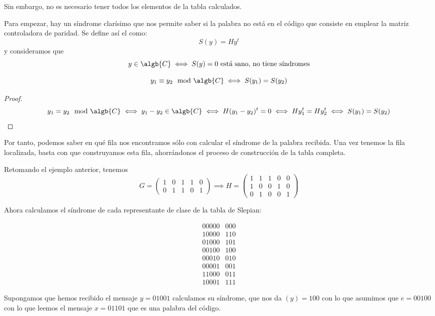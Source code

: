 Sin embargo, no es necesario tener todos los elementos de la tabla calculados.

Para empezar, hay un síndrome clarísimo que nos permite saber si la palabra no está en el código que consiste en emplear la matriz controladora de paridad. Se define así el  como:
\[S(y) = Hy^t\]
y consideramos que
\[y \in \algb{C} \iff S(y) = 0 \text{ está sano, no tiene síndromes}\]

\obs
\[y_1 \equiv y_2 \mod \algb{C} \iff S(y_1)=S(y_2)\]
\begin{proof}
\[y_1 = y_2 \mod \algb{C} \iff y_1-y_2 \in \algb{C} \iff H(y_1-y_2)^t = 0 \iff Hy_1^t = Hy_2^t \iff S(y_1)=S(y_2)\]
\end{proof}

Por tanto, podemos saber en qué fila nos encontramos sólo con calcular el síndrome de la palabra recibida. Una vez tenemos la fila localizada, basta con que construyamos esta fila, ahorrándonos el proceso de construcción de la tabla completa.

\begin{example}
Retomando el ejemplo anterior, tenemos
\[G = \left(\begin{array}{ccccc} 1 & 0 & 1 & 1 & 0 \\ 0 & 1 & 1 & 0 & 1 \end{array}\right)  \implies H = \left(\begin{array}{ccccc}
1 & 1 & 1 & 0 & 0 \\
1 & 0 & 0 & 1 & 0 \\
0 & 1 & 0 & 0 & 1
\end{array}\right) \]

Ahora calculamos el síndrome de cada representante de clase de la tabla de Slepian:

\[\begin{array}{cc}
00000 & 000\\
10000 & 110\\
01000 & 101\\
00100 & 100\\
00010 & 010\\
00001 & 001\\
11000 & 011\\
10001 & 111
\end{array}\]

Supongamos que hemos recibido el mensaje $y=01001$ calculamos su síndrome, que nos da $(y)=100$ con lo que asumimos que $e=00100$ con lo que leemos el mensaje $x=01101$ que es una palabra del código.
\end{example}

